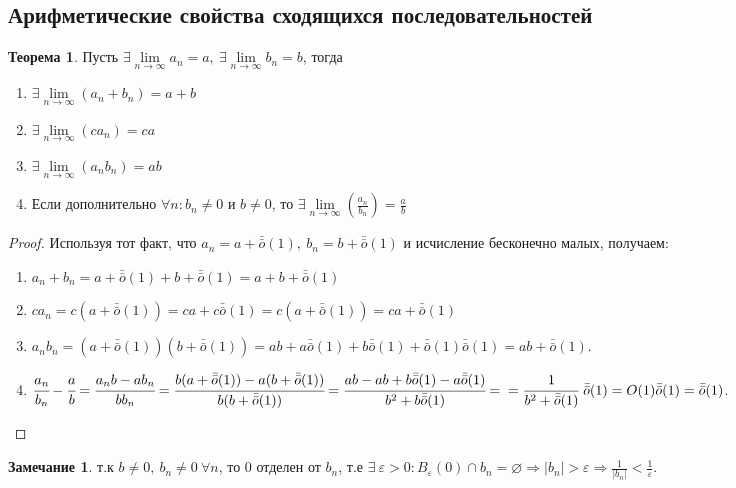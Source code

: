 \documentclass[a4paper, 12pt]{article}
\renewcommand{\epsilon}{\varepsilon}
\renewcommand{\emptyset}{\varnothing}
\newcommand{\om}{\bar{\bar{o}}}
\theoremstyle{definition}
\newtheorem*{theorem}{Теорема}
\newtheorem*{comm}{Замечание}
\begin{document}
    \subsection{Арифметические свойства сходящихся последовательностей}
        \begin{theorem}
            Пусть $\exists \lim\limits_{n\to\infty} a_n=a,\ \exists \lim\limits_{n\to\infty} b_n=b$, тогда
            \begin{enumerate}
                \item $\exists \lim\limits_{n\to\infty} (a_n+b_n) = a+b$
                \item $\exists \lim\limits_{n\to\infty} (ca_n) = ca$
                \item $\exists \lim\limits_{n\to\infty} (a_n b_n) = ab$
                \item Если дополнительно $\forall n: b_n\ne 0$ и $b\ne 0$, то $\exists \lim\limits_{n\to\infty} (\frac{a_n}{b_n})=\frac{a}{b}$
            \end{enumerate}
        \end{theorem} 
        \begin{proof}
            Используя тот факт, что $a_n=a+\bar{\bar{o}}{(1)},\ b_n=b+\bar{\bar{o}}{(1)}$ и исчисление бесконечно малых, получаем:
            \begin{enumerate}
                \item $a_n+b_n=a+\om(1)+b+\om(1)=a+b+\om(1)$
                \item $ca_n=c(a+\om(1))=ca+c\om(1)=c(a+\om(1))=ca+\om(1)$
                \item $a_n b_n=(a+\om(1))(b+\om(1))=ab+a \bar{\bar{o}}{(1)}+b \bar{\bar{o}}{(1)}+\bar{\bar{o}}{(1)}\bar{\bar{o}}{(1)}=ab+\bar{\bar{o}}{(1)}$.
                \item $\cfrac{a_n}{b_n}-\cfrac{a}{b}=\cfrac{a_n b-ab_n}{bb_n}=\cfrac{b(a+\bar{\bar{o}}{(1)})-a(b+\bar{\bar{o}}{(1)})}{b(b+\bar{\bar{o}}{(1)})}=\cfrac{ab-ab+b \bar{\bar{o}}{(1)}-a \bar{\bar{o}}{(1)}}{b^2+b \bar{\bar{o}}{(1)}}=\\=\cfrac{1}{b^2+\bar{\bar{o}}{(1)}}\ \bar{\bar{o}}{(1)}=O(1) \bar{\bar{o}}{(1)}=\bar{\bar{o}}{(1)}$.
            \end{enumerate}
        \end{proof}
        \begin{comm}
            т.к $b\ne 0,\ b_n\ne 0\ \forall n$, то 0 отделен от $b_n$, т.е $\exists\ \epsilon>0: B_{\epsilon}(0)\cap b_n=\emptyset \Rightarrow |b_n|>\epsilon \Rightarrow \frac{1}{|b_n|}<\frac{1}{\epsilon}$.
        \end{comm}
\end{document}
